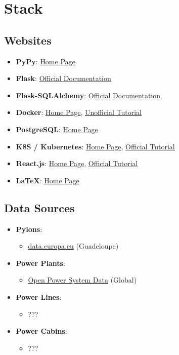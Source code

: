 
\chapter{Stack} %

\section*{Websites}
\begin{itemize}
    \item \textbf{PyPy}: \href{https://www.pypy.org/}{Home Page}
    \item \textbf{Flask}: \href{https://flask.palletsprojects.com/en/2.0.x/}{Official Documentation}
    \item \textbf{Flask-SQLAlchemy}: \href{https://flask-sqlalchemy.palletsprojects.com/en/2.x/}{Official Documentation}
    \item \textbf{Docker}: \href{https://www.docker.com/}{Home Page}, \href{https://docker-curriculum.com/}{Unofficial Tutorial}
    \item \textbf{PostgreSQL}: \href{https://www.postgresql.org/}{Home Page}
    \item \textbf{K8S / Kubernetes}: \href{https://kubernetes.io/}{Home Page}, \href{https://kubernetes.io/docs/tutorials/kubernetes-basics/}{Official Tutorial}
    \item \textbf{React.js}: \href{https://reactjs.org/}{Home Page}, \href{https://reactjs.org/tutorial/tutorial.html}{Official Tutorial}
    \item \textbf{\LaTeX}: \href{https://www.latex-project.org/}{Home Page}
\end{itemize}

\section*{Data Sources}
\begin{itemize}
    \item \textbf{Pylons}: \begin{itemize}
        \item \href{https://data.europa.eu/data/datasets/60240e4c78071650197ce5a4?locale=en}{data.europa.eu} (Guadeloupe)
    \end{itemize}

    \item \textbf{Power Plants}: \begin{itemize}
        \item \href{https://doi.org/10.25832/renewable_power_plants/2020-08-25}{Open Power System Data} (Global)
    \end{itemize}

    \item \textbf{Power Lines}: \begin{itemize}
        \item ???
    \end{itemize}

    \item \textbf{Power Cabins}: \begin{itemize}
        \item ???
    \end{itemize}
\end{itemize}